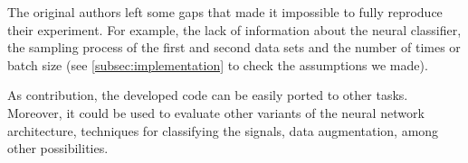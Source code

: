 The original authors left some gaps that made it impossible to fully reproduce their experiment. For example, the lack of information about the neural classifier, the sampling process of the first and second data sets and the number of times or batch size (see \ref{subsec:implementation} to check the assumptions we made).

As contribution, the developed code can be easily ported to other tasks. Moreover, it could be used to evaluate other variants of the neural network architecture, techniques for classifying the signals, data augmentation, among other possibilities.  



